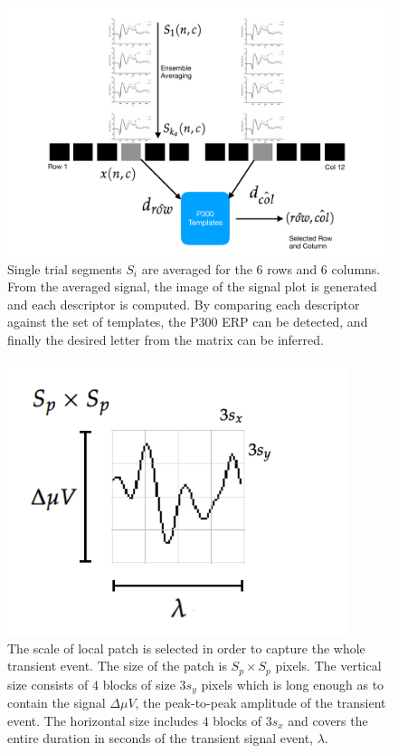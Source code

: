 \documentclass[utf8]{frontiersSCNS} %
\begin{document}
\begin{figure}[htp]
\centering
\includegraphics[width=15cm]{classificationgraph.pdf}
\caption{Single trial segments $S_i$ are averaged for the 6 rows and 6 columns. From the averaged signal, the image of the signal plot is generated and each descriptor is computed.  By comparing each descriptor against the set of templates, the P300 ERP can be detected, and finally the desired letter from the matrix can be inferred.}
\label{fig:classification}
\end{figure}

\begin{figure}[htb]
\centering
\includegraphics[width=10cm]{patchgeometry.pdf}
\caption{The scale of local patch is selected in order to capture the whole transient event.  The size of the patch is $S_p \times S_p$ pixels. The vertical size consists of $4$ blocks of size $3 s_y$ pixels which is long enough as to contain the signal $\Delta  \mu V $, the peak-to-peak amplitude of the transient event. The horizontal size includes $4$ blocks  of $3 s_x$ and covers the entire duration in seconds of the transient signal event, $ \lambda $.   }
\label{fig:sampledescriptor2}
\end{figure}
\end{document}
